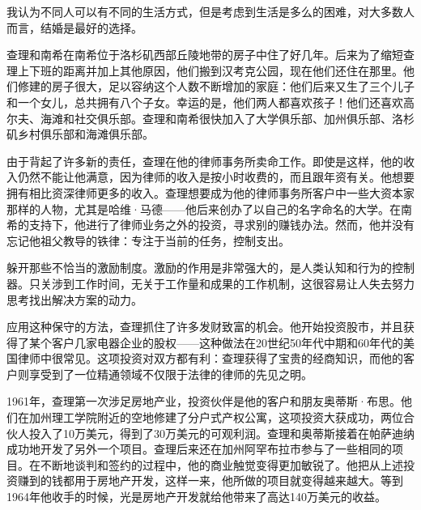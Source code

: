 \begin{WisdomBox}
\par

我认为不同人可以有不同的生活方式，但是考虑到生活是多么的困难，对大多数人而言，结婚是最好的选择。
\par
\end{WisdomBox}

查理和南希在南希位于洛杉矶西部丘陵地带的房子中住了好几年。后来为了缩短查理上下班的距离并加上其他原因，他们搬到汉考克公园，现在他们还住在那里。他们修建的房子很大，足以容纳这个人数不断增加的家庭：他们后来又生了三个儿子和一个女儿，总共拥有八个子女。幸运的是，他们两人都喜欢孩子！他们还喜欢高尔夫、海滩和社交俱乐部。查理和南希很快加入了大学俱乐部、加州俱乐部、洛杉矶乡村俱乐部和海滩俱乐部。
\par

由于背起了许多新的责任，查理在他的律师事务所卖命工作。即使是这样，他的收入仍然不能让他满意，因为律师的收入是按小时收费的，而且跟年资有关。他想要拥有相比资深律师更多的收入。查理想要成为他的律师事务所客户中一些大资本家那样的人物，尤其是哈维·马德——他后来创办了以自己的名字命名的大学。在南希的支持下，他进行了律师业务之外的投资，寻求别的赚钱办法。然而，他并没有忘记他祖父教导的铁律：专注于当前的任务，控制支出。
\par

\begin{WisdomBox}
\par

躲开那些不恰当的激励制度。激励的作用是非常强大的，是人类认知和行为的控制器。只关涉到工作时间，无关于工作量和成果的工作机制，这很容易让人失去努力思考找出解决方案的动力。
\par
\end{WisdomBox}

应用这种保守的方法，查理抓住了许多发财致富的机会。他开始投资股市，并且获得了某个客户几家电器企业的股权——这种做法在20世纪50年代中期和60年代的美国律师中很常见。这项投资对双方都有利：查理获得了宝贵的经商知识，而他的客户则享受到了一位精通领域不仅限于法律的律师的先见之明。
\par

1961年，查理第一次涉足房地产业，投资伙伴是他的客户和朋友奥蒂斯·布思。他们在加州理工学院附近的空地修建了分户式产权公寓，这项投资大获成功，两位合伙人投入了10万美元，得到了30万美元的可观利润。查理和奥蒂斯接着在帕萨迪纳成功地开发了另外一个项目。查理后来还在加州阿罕布拉市参与了一些相同的项目。在不断地谈判和签约的过程中，他的商业触觉变得更加敏锐了。他把从上述投资赚到的钱都用于房地产开发，这样一来，他所做的项目就变得越来越大。等到1964年他收手的时候，光是房地产开发就给他带来了高达140万美元的收益。
\par

